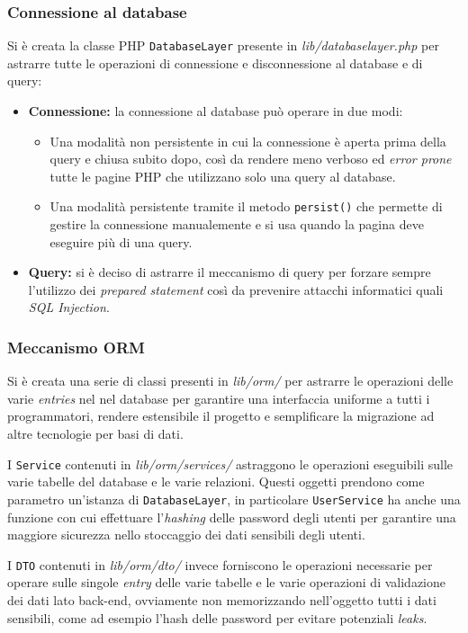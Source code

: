 \subsubsection{Connessione al database}
Si è creata la classe PHP \texttt{DatabaseLayer} presente in \textit{lib/databaselayer.php} per astrarre tutte le operazioni di connessione e disconnessione al database e di query:
\begin{itemize}
    \item \textbf{Connessione:} la connessione al database può operare in due modi:
    \begin{itemize}
        \item Una modalità non persistente in cui la connessione è aperta prima della query e chiusa subito dopo, così da rendere meno verboso ed \textit{error prone} tutte le pagine PHP che utilizzano solo una query al database.
        \item Una modalità persistente tramite il metodo \texttt{persist()} che permette di gestire la connessione manualemente e si usa quando la pagina deve eseguire più di una query.
    \end{itemize}
    \item \textbf{Query:} si è deciso di astrarre il meccanismo di query per forzare sempre l'utilizzo dei \textit{prepared statement} così da prevenire attacchi informatici quali \textit{SQL Injection}.
\end{itemize}

\subsubsection{Meccanismo ORM}
Si è creata una serie di classi presenti in \textit{lib/orm/} per astrarre le operazioni delle varie \textit{entries} nel nel database per garantire una interfaccia uniforme a tutti i programmatori, rendere estensibile il progetto e semplificare la migrazione ad altre tecnologie per basi di dati.

I \texttt{Service} contenuti in \textit{lib/orm/services/} astraggono le operazioni eseguibili sulle varie tabelle del database e le varie relazioni. Questi oggetti prendono come parametro un'istanza di \texttt{DatabaseLayer}, in particolare \texttt{UserService} ha anche una funzione con cui effettuare l'\textit{hashing} delle password degli utenti per garantire una maggiore sicurezza nello stoccaggio dei dati sensibili degli utenti.

I \texttt{DTO} contenuti in \textit{lib/orm/dto/} invece forniscono le operazioni necessarie per operare sulle singole \textit{entry} delle varie tabelle e le varie operazioni di validazione dei dati lato back-end, ovviamente non memorizzando nell'oggetto tutti i dati sensibili, come ad esempio l'hash delle password per evitare potenziali \textit{leaks}.

